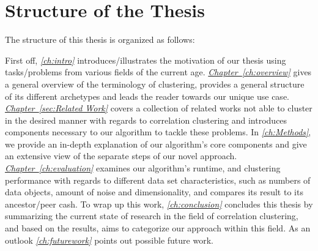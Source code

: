 \section{Structure of the Thesis}
The structure of this thesis is organized as follows:

First off, \textit{\autoref{ch:intro}} introduces/illustrates the motivation of our thesis using tasks/problems from various fields of the current age.
\textit{\hyperref[ch:overview]{Chapter~\ref*{ch:overview}}} gives a general overview of the terminology of clustering, provides a general structure of its different archetypes and leads the reader towards our unique use case.
\textit{\hyperref[sec:Related Work]{Chapter~\ref*{sec:Related Work}}} covers a collection of related works not able to cluster in the desired manner with regards to correlation clustering and introduces components necessary to our algorithm to tackle these problems.
In \textit{\autoref{ch:Methods}}, we provide an in-depth explanation of our algorithm's core components and give an extensive view of the separate steps of our novel approach.
\textit{\hyperref[ch:evaluation]{Chapter~\ref*{ch:evaluation}}} examines our algorithm's runtime, and clustering performance with regards to different data set characteristics, such as numbers of data objects, amount of noise and dimensionality, and compares its result to its ancestor/peer \acrshort{cash}.
To wrap up this work, \textit{\autoref{ch:conclusion}} concludes this thesis by summarizing the current state of research in the field of correlation clustering, and based on the results, aims to categorize our approach within this field. As an outlook \textit{\autoref{ch:futurework}} points out possible future work.


